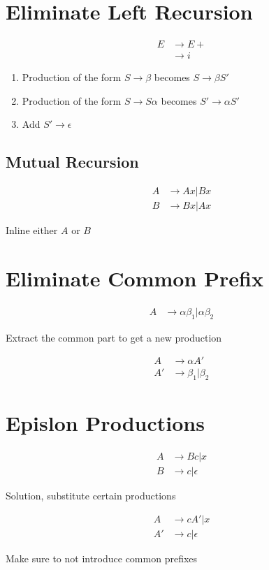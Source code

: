 \section{Eliminate Left Recursion}
\label{section: grammar/eliminate left recursion}

  \begin{align*}
    E &\to E+ \\
    &\to i
  \end{align*}

  \begin{enumerate}
    \item Production of the form $ S \to \beta $ becomes $ S \to \beta S' $
    \item Production of the form $ S \to S \alpha $ becomes $ S' \to \alpha S' $
    \item Add $ S' \to \epsilon $
  \end{enumerate}

  \subsection{Mutual Recursion}

    \begin{align*}
      A &\to Ax | Bx \\
      B &\to Bx | Ax
    \end{align*}

    Inline either $ A $ or $ B $

\section{Eliminate Common Prefix}
\label{section: grammar/eliminate common prefix}

  \begin{align*}
    A &\to \alpha \beta_{1} | \alpha \beta_{2}
  \end{align*}

  Extract the common part to get a new production

  \begin{align*}
    A &\to \alpha A' \\
    A' &\to \beta_{1} | \beta_{2}
  \end{align*}

\section{Epislon Productions}

  \begin{align*}
    A &\to Bc | x \\
    B &\to c | \epsilon
  \end{align*}

  Solution, substitute certain productions

  \begin{align*}
    A &\to c A' | x \\
    A' &\to c | \epsilon
  \end{align*}

  Make sure to not introduce common prefixes
